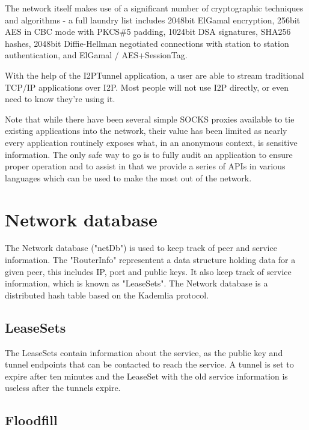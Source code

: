 \documentclass[a4paper,twocolumn,12pt]{article}
\begin{document}
The network itself makes use of a significant number of cryptographic
techniques and algorithms - a full laundry list includes 2048bit
ElGamal\cite{DBLP:journals/tit/Elgamal85} encryption, 256bit
AES\cite{books/sp/DaemenR02} in CBC mode with PKCS\#5 padding, 1024bit DSA
signatures, SHA256 hashes, 2048bit Diffie-Hellman negotiated connections with
station to station authentication, and
ElGamal\cite{DBLP:journals/tit/Elgamal85} / AES+SessionTag.

\vspace{2 em}

With the help of the I2PTunnel application, a user are able to stream
traditional TCP/IP applications over I2P. Most people will not use I2P
directly, or even need to know they're using it.

Note that while there have been several simple SOCKS proxies available to tie
existing applications into the network, their value has been limited as nearly
every application routinely exposes what, in an anonymous context, is sensitive
information. The only safe way to go is to fully audit an application to ensure
proper operation and to assist in that we provide a series of APIs in various
languages which can be used to make the most out of the network.

\section{Network database}

The Network database ("netDb") is used to keep track of peer and service
information. The "RouterInfo" representent a data structure holding data for a
given peer, this includes IP, port and public keys. It also keep track of
service information, which is known as "LeaseSets". The Network database is a
distributed hash table based on the
Kademlia\cite{Maymounkov:2002:KPI:646334.687801} protocol.

\subsection{LeaseSets}

The LeaseSets contain information about the service, as the public key and
tunnel endpoints that can be contacted to reach the service. A tunnel is set to
expire after ten minutes and the LeaseSet with the old service information is
useless after the tunnels expire.

\subsection{Floodfill}
\end{document}
